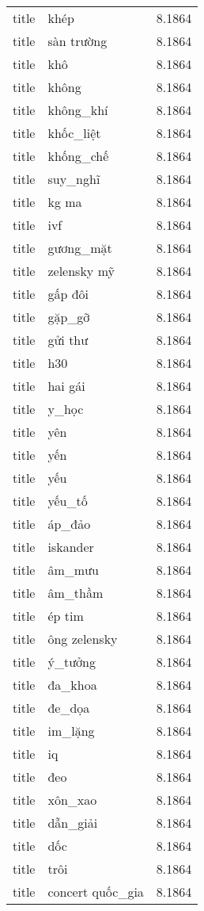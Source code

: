 \documentclass{article}
\begin{document}
\begin{tabular}{lll}
title & khép & 8.1864\\
title & sàn trường & 8.1864\\
title & khô & 8.1864\\
title & không & 8.1864\\
title & không\_khí & 8.1864\\
title & khốc\_liệt & 8.1864\\
title & khống\_chế & 8.1864\\
title & suy\_nghĩ & 8.1864\\
title & kg ma & 8.1864\\
title & ivf & 8.1864\\
title & gương\_mặt & 8.1864\\
title & zelensky mỹ & 8.1864\\
title & gấp đôi & 8.1864\\
title & gặp\_gỡ & 8.1864\\
title & gửi thư & 8.1864\\
title & h30 & 8.1864\\
title & hai gái & 8.1864\\
title & y\_học & 8.1864\\
title & yên & 8.1864\\
title & yến & 8.1864\\
title & yếu & 8.1864\\
title & yếu\_tố & 8.1864\\
title & áp\_đảo & 8.1864\\
title & iskander & 8.1864\\
title & âm\_mưu & 8.1864\\
title & âm\_thầm & 8.1864\\
title & ép tim & 8.1864\\
title & ông zelensky & 8.1864\\
title & ý\_tưởng & 8.1864\\
title & đa\_khoa & 8.1864\\
title & đe\_dọa & 8.1864\\
title & im\_lặng & 8.1864\\
title & iq & 8.1864\\
title & đeo & 8.1864\\
title & xôn\_xao & 8.1864\\
title & dẫn\_giải & 8.1864\\
title & dốc & 8.1864\\
title & trôi & 8.1864\\
title & concert quốc\_gia & 8.1864\\

\end{tabular}
\end{document}
